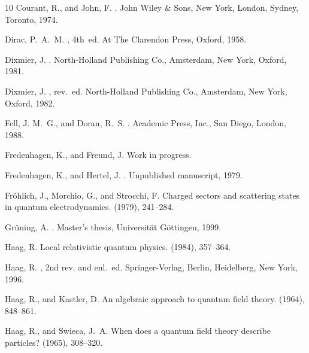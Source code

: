 \documentclass[11pt,twoside,openright]{report}
\theoremstyle{definition}
\theoremstyle{plain}
\theoremstyle{remark}
\theoremstyle{assumption}
\begin{document}
\begin{thebibliography}{10}
{\sc Courant, R., and John, F.}
.
\newblock John Wiley \& Sons, New York, London, Sydney, Toronto, 1974.

{\sc Dirac, P.~A.~M.}
, 4th~ed.
\newblock At The Clarendon Press, Oxford, 1958.

{\sc Dixmier, J.}
.
\newblock North-Holland Publishing Co., Amsterdam, New York, Oxford, 1981.

{\sc Dixmier, J.}
, rev.~ed.
\newblock North-Holland Publishing Co., Amsterdam, New York, Oxford, 1982.

{\sc Fell, J. M.~G., and Doran, R.~S.}
.
\newblock Academic Press, Inc., San Diego, London, 1988.

{\sc Fredenhagen, K., and Freund, J.}
\newblock Work in progress.

{\sc Fredenhagen, K., and Hertel, J.}
.
\newblock Unpublished manuscript, 1979.

{\sc Fr\"ohlich, J., Morchio, G., and Strocchi, F.}
\newblock Charged sectors and scattering states in quantum electrodynamics.
 (1979), 241--284.

{\sc Gr\"{u}ning, A.}
.
\newblock Master's thesis, Universit\"{a}t G\"{o}ttingen, 1999.

{\sc Haag, R.}
\newblock Local relativistic quantum physics.
 (1984), 357--364.

{\sc Haag, R.}
, 2nd rev. and enl.~ed.
\newblock Springer-Verlag, Berlin, Heidelberg, New York, 1996.

{\sc Haag, R., and Kastler, D.}
\newblock An algebraic approach to quantum field theory.
 (1964), 848--861.

{\sc Haag, R., and Swieca, J.~A.}
\newblock When does a quantum field theory describe particles?
 (1965), 308--320.


\end{thebibliography}
\end{document}
